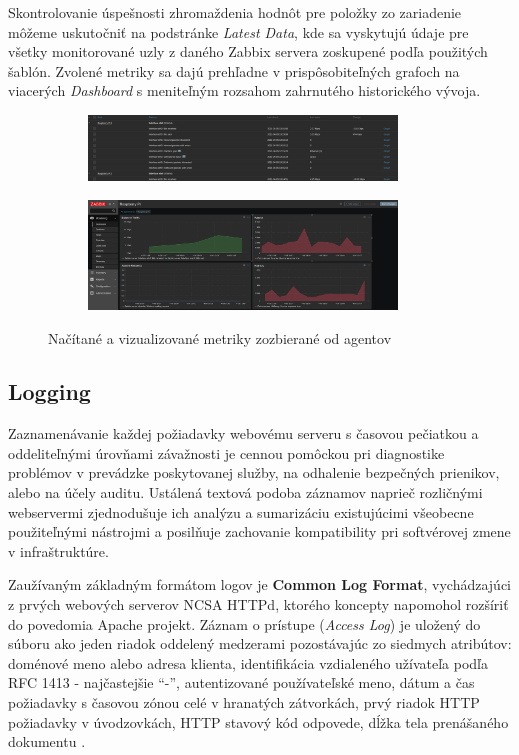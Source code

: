 \documentclass[12pt, a4paper]{article}
\begin{document}
Skontrolovanie úspešnosti zhromaždenia hodnôt pre položky zo zariadenie môžeme uskutočniť na 
podstránke \emph{Latest Data}, kde sa vyskytujú údaje pre všetky monitorované uzly
z daného Zabbix servera zoskupené podľa použitých šablón. Zvolené metriky sa dajú prehľadne v 
prispôsobiteľných grafoch na viacerých \emph{Dashboard} s meniteľným rozsahom zahrnutého
historického vývoja.
\begin{figure}[h]
	\centering
		\begin{subfigure}[t]{\textwidth}
  		\centering
  		\includegraphics[width=0.9\textwidth]{images/zabbix-eth-rpi2.png}
	\end{subfigure}
	\vspace{1em}
	\begin{subfigure}[t]{\textwidth}
  		\centering
  		\includegraphics[width=0.9\textwidth]{images/zabbix-dashboard.png}
	\end{subfigure}
	\caption{Načítané a vizualizované metriky zozbierané od agentov}
\end{figure}

\subsection{Logging}
Zaznamenávanie každej požiadavky webovému serveru s časovou pečiatkou a oddeliteľnými úrovňami závažnosti 
je cennou pomôckou pri diagnostike problémov v prevádzke poskytovanej služby, na odhalenie bezpečných 
prienikov, alebo na účely auditu. Ustálená textová podoba záznamov naprieč rozličnými webservermi 
zjednodušuje ich analýzu a sumarizáciu existujúcimi všeobecne použiteľnými nástrojmi a posilňuje zachovanie 
kompatibility pri softvérovej zmene v infraštruktúre. 

Zaužívaným základným formátom logov je \textbf{Common Log Format}, vychádzajúci z prvých webových 
serverov NCSA HTTPd, ktorého koncepty napomohol rozšíriť do povedomia Apache projekt. Záznam o prístupe
(\emph{Access Log}) je uložený do súboru ako jeden riadok oddelený medzerami pozostávajúc zo siedmych
atribútov: doménové meno alebo adresa klienta, identifikácia vzdialeného užívateľa podľa
RFC 1413 - najčastejšie \enquote{-}, autentizované používateľské meno, dátum a čas požiadavky s časovou zónou 
celé v hranatých zátvorkách, prvý riadok HTTP požiadavky v úvodzovkách, HTTP stavový kód odpovede, dĺžka tela 
prenášaného dokumentu \cite{common-log}. 
\end{document}
